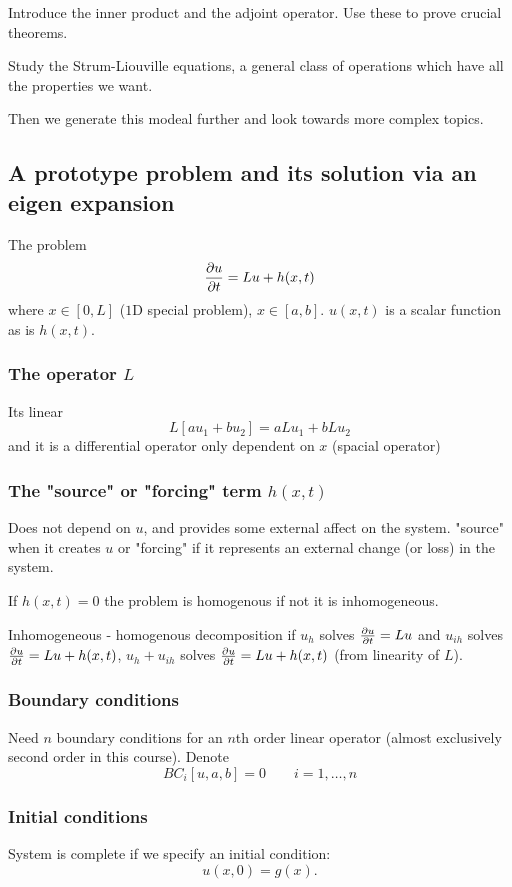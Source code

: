 \documentclass[10pt, a4paper]{article}
\begin{document}
Introduce the inner product and the adjoint operator.
Use these to prove crucial theorems.

Study the Strum-Liouville equations,
a general class of operations which have all the properties we want.

Then we generate this modeal further and look towards more complex topics.

\subsection{A prototype problem and its solution via an eigen expansion}

The problem
\[
\pd[u]{t} = Lu + h(x, t)
\]
where $x \in [0, L]$
($1$D special problem),
$x \in [a, b]$.
$u(x, t)$ is a scalar function as is $h(x, t)$.

\subsubsection{The operator \texorpdfstring{$L$}{}}
Its linear
\[
L[au_1 + bu_2] = aLu_1 + bLu_2
\]
and it is a differential operator only dependent on $x$
(spacial operator)

\subsubsection{The
"source"
or
"forcing"
term \texorpdfstring{$h(x, t)$}{}}
Does not depend on $u$,
and provides some external affect on the system.
"source"
when it creates $u$ or
"forcing"
if it represents an external change
(or loss)
in the system.

If $h(x, t) = 0$ the problem is homogenous if not it is inhomogeneous.

Inhomogeneous - homogenous decomposition if $u_h$ solves $\pd[u]{t} = Lu$ and $u_{ih}$ solves $\pd[u]{t} = Lu + h(x, t)$,
$u_h + u_{ih}$ solves $\pd[u]{t} = Lu + h(x, t)$
(from linearity of $L$).

\subsubsection{Boundary conditions}
Need $n$ boundary conditions for an $n$th order linear operator
(almost exclusively second order in this course).
Denote
\[
BC_i[u, a, b] = 0\qquad i = 1, \dotsc, n
\]

\subsubsection{Initial conditions}
System is complete if we specify an initial condition:
\[
u(x, 0) = g(x).
\]
\end{document}
